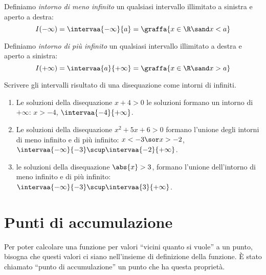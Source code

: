 \begin{newdef}{}{}
Definiamo \emph{intorno di meno infinito} un qualsiasi intervallo illimitato 
a sinistra e aperto a destra:
\[I(-\infty) = \intervaa{-\infty}{a} = \graffa{x \in \R \sand x < a}\]
\end{newdef}

\begin{center} \intornomenoinf \end{center}

\begin{newdef}{}{}
Definiamo \emph{intorno di più infinito} un qualsiasi intervallo illimitato a 
destra e aperto a sinistra:
\[I(+\infty) = \intervaa{a}{+\infty} = \graffa{x \in \R \sand x > a}\]
\end{newdef}

\begin{center} \intornopiuinf \end{center}

\begin{esempio} Scrivere gli intervalli risultato di una disequazione come 
intorni di infiniti.
\begin{enumerate}[label=\alph*)]
\item Le soluzioni della disequazione \(x+4 > 0\) le soluzioni 
formano un intorno di \(+\infty\): \(x > -4\), \(\intervaa{-4}{+\infty}\).
\item Le soluzioni della disequazione \(x^2+5x+6 > 0\) formano 
l'unione degli intorni di meno infinito e di più infinito: 
\(x < -3 \sor x > -2\), 
\(\intervaa{-\infty}{-3} \scup \intervaa{-2}{+\infty}\).
\item le soluzioni della disequazione \(\abs{x}>3\), 
formano l'unione dell'intorno di meno infinito e di più infinito:
\(\intervaa{-\infty}{-3} \scup \intervaa{3}{+\infty}\).
\end{enumerate} 
\end{esempio}

\section{Punti di accumulazione}
\label{sec:topologiapuntiaccumulazione}

Per poter calcolare una funzione per valori ``vicini quanto si vuole'' 
a un punto, bisogna che questi valori ci siano nell'insieme di definizione 
della funzione. 
È stato chiamato ``punto di accumulazione'' un punto che ha questa proprietà.

